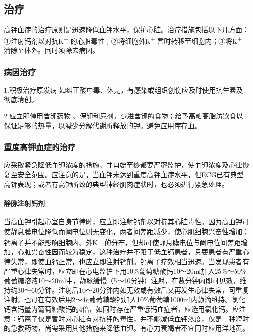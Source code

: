 \subsection{治疗}

高钾血症的治疗原则是迅速降低血钾水平，保护心脏。治疗措施包括以下几方面：①注射钙剂以对抗K\textsuperscript{+}
的心脏毒性；②将细胞外K\textsuperscript{+}
暂时转移至细胞内；③将K\textsuperscript{+} 清除至体外。同时须除去病因。

\subsubsection{病因治疗}

1.积极治疗原发病
如纠正酸中毒、休克，有感染或组织创伤应及时使用抗生素及彻底清创。

2.应立即停用含钾药物
、保钾利尿剂，少进含钾的食物；给予高糖高脂肪饮食以保证足够的热量，以减少分解代谢所释放的钾。避免应用库存血。

\subsubsection{重度高钾血症的治疗}

应采取紧急降低血钾浓度的措施，并自始至终都要严密监护，使血钾浓度及心律恢复至安全范围。应注意的是，当血钾未达到重度高钾血症水平，但ECG已有典型高钾表现；或者有高钾所致的典型神经肌肉症状时，也必须进行紧急处理。

\paragraph{静脉注射钙剂}

当高血钾引起心室自身节律时，应立即注射钙剂以对抗其心脏毒性。因为高血钾可使静息膜电位降低而阈电位则无变化，两者间差距减少，使心肌细胞兴奋性增加；钙离子并不能影响细胞内、外K\textsuperscript{+}
的分布，但却可使静息膜电位与阈电位间差距增加，心脏兴奋性因而较为稳定，这种治疗并不限于低血钙患者，只要患者有严重心律失常，即使血钙正常，也应立即注射钙剂。钙离子疗效相当迅速。当发现患者有严重心律失常时，应立即在心电监护下用10\%葡萄糖酸钙10～20ml加入25\%～50\%葡萄糖溶液10～20ml中，静脉缓慢（5～10分钟）注射，在数分钟内即可见效，维持约30～60分钟。注射后10～20分钟内如无效或有效后又再发生心律失常，可重复注射。也可在有效后用2～4g葡萄糖酸钙加入10\%葡萄糖1000ml内静滴维持。氯化钙含钙量为葡萄糖酸钙的4倍，如同时存在严重低钙血症者，应选用氯化钙。应注意：钙离子仅是暂时对心脏有对抗钾的毒性，并不能减低血钾浓度，仅是一种短时的急救药物，尚需采用其他措施来降低血钾。有心力衰竭者不宜同时应用洋地黄。

